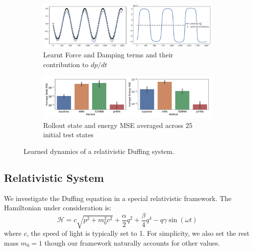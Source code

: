 \documentclass[twoside]{article}
\begin{document}
\begin{figure}[h!]
\centering
\captionsetup{justification=centering}
	\begin{subfigure}[b]{0.48\textwidth}
		\centering
		\includegraphics[width=\textwidth]{figures/figures/relativity/1/relativity_dpdt_0.pdf}
		\caption{Learnt Force and Damping terms and their contribution to $dp/dt$}
	\end{subfigure}
	\begin{subfigure}[b]{0.48\textwidth}
	    \centering
		\includegraphics[width=\textwidth]{figures/figures/relativity/1/relativity_errors_0.pdf}
		\caption{Rollout state and energy MSE averaged across 25 initial test states}
	\end{subfigure}
\caption{Learned dynamics of a relativistic Duffing system.}
\end{figure}
\subsection{Relativistic System}
We investigate the Duffing equation in a special relativistic framework. The Hamiltonian under consideration is:
\begin{equation}
\mathcal{H} =  c\sqrt{p^2 +m_0^2c^2} + \frac{\alpha}{2}q^2 +\frac{\beta}{4}q^4 - q\gamma\sin(\omega t)
\end{equation}
where $c$, the speed of light is typically set to 1. For simplicity, we also set the rest mass $m_0=1$ though our framework naturally accounts for other values.
\end{document}
